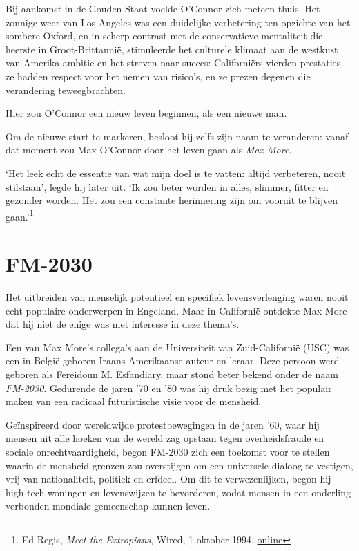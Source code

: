 \documentclass[
  a5paper,
  smalldemyvopaper,11pt,twoside,onecolumn,openright,extrafontsizes,
hidelinks]{memoir}
\begin{document}
Bij aankomst in de Gouden Staat voelde O'Connor zich meteen thuis. Het
zonnige weer van Los Angeles was een duidelijke verbetering ten opzichte
van het sombere Oxford, en in scherp contrast met de conservatieve
mentaliteit die heerste in Groot-Brittannië, stimuleerde het culturele
klimaat aan de westkust van Amerika ambitie en het streven naar succes:
Californiërs vierden prestaties, ze hadden respect voor het nemen van
risico's, en ze prezen degenen die verandering teweegbrachten.

Hier zou O'Connor een nieuw leven beginnen, als een nieuwe man.

Om de nieuwe start te markeren, besloot hij zelfs zijn naam te
veranderen: vanaf dat moment zou Max O'Connor door het leven gaan als
\emph{Max More}.

`Het leek echt de essentie van wat mijn doel is te vatten: altijd
verbeteren, nooit stilstaan', legde hij later uit. `Ik zou beter worden
in alles, slimmer, fitter en gezonder worden. Het zou een constante
herinnering zijn om vooruit te blijven gaan.'\footnote{Ed Regis,
  \emph{Meet the Extropians}, Wired, 1 oktober 1994,
  \href{https://www.wired.com/1994/10/extropians/}{online}}

\section{FM-2030}\label{fm-2030}

Het uitbreiden van menselijk potentieel en specifiek levensverlenging
waren nooit echt populaire onderwerpen in Engeland. Maar in Californië
ontdekte Max More dat hij niet de enige was met interesse in deze
thema's.

Een van Max More's collega's aan de Universiteit van Zuid-Californië
(USC) was een in België geboren Iraans-Amerikaanse auteur en leraar.
Deze persoon werd geboren als Fereidoun M. Esfandiary, maar stond beter
bekend onder de naam \emph{FM-2030}. Gedurende de jaren '70 en '80 was
hij druk bezig met het populair maken van een radicaal futuristische
visie voor de mensheid.

Geïnspireerd door wereldwijde protestbewegingen in de jaren '60, waar
hij mensen uit alle hoeken van de wereld zag opstaan tegen
overheidsfraude en sociale onrechtvaardigheid, begon FM-2030 zich een
toekomst voor te stellen waarin de mensheid grenzen zou overstijgen om
een universele dialoog te vestigen, vrij van nationaliteit, politiek en
erfdeel. Om dit te verwezenlijken, begon hij high-tech woningen en
levenswijzen te bevorderen, zodat mensen in een onderling verbonden
mondiale gemeenschap kunnen leven.
\end{document}
